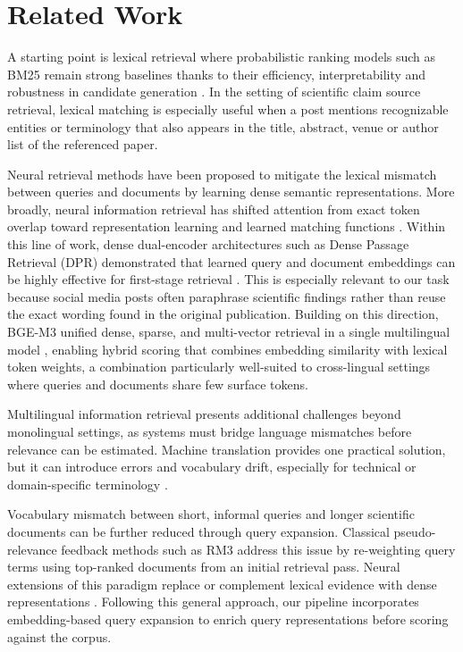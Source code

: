 \section{Related Work}
\label{sec:related}

A starting point is lexical retrieval where probabilistic ranking models such as BM25 remain strong baselines thanks to their efficiency, interpretability and robustness in candidate generation \citep{RobertsonZaragoza2009}. In the setting of scientific claim source retrieval, lexical matching is especially useful when a post mentions recognizable entities or terminology that also appears in the title, abstract, venue or author list of the referenced paper.

Neural retrieval methods have been proposed to mitigate the lexical mismatch between queries and documents by learning dense semantic representations. More broadly, neural information retrieval has shifted attention from exact token overlap toward representation learning and learned matching functions \citep{MarchesinEtAl2020}. Within this line of work, dense dual-encoder architectures such as Dense Passage Retrieval (DPR) demonstrated that learned query and document embeddings can be highly effective for first-stage retrieval \citep{KarpukhinEtAl2020}. This is especially relevant to our task because social media posts often paraphrase scientific findings rather than reuse the exact wording found in the original publication. Building on this direction, BGE-M3 unified dense, sparse, and multi-vector retrieval in a single multilingual model \citep{bge-m3},
enabling hybrid scoring that combines embedding similarity with lexical token weights, a combination particularly well-suited to cross-lingual settings where queries and documents share few surface tokens.

Multilingual information retrieval presents additional challenges beyond monolingual settings, as systems must bridge language mismatches before relevance can be estimated. Machine translation provides one practical solution, but it can introduce errors and vocabulary drift, especially for technical or domain-specific terminology \citep{SennrichEtAl2016}.

Vocabulary mismatch between short, informal queries and longer scientific documents can be further reduced through query expansion. Classical pseudo-relevance feedback methods such as RM3 \citep{LavrenkoEtAl2001} address this issue by re-weighting query terms using top-ranked documents from an initial retrieval pass. Neural extensions of this paradigm replace or complement lexical evidence with dense representations \citep{WangEtAl2021PRF}. Following this general approach, our pipeline incorporates embedding-based query expansion to enrich query representations before scoring against the corpus.


